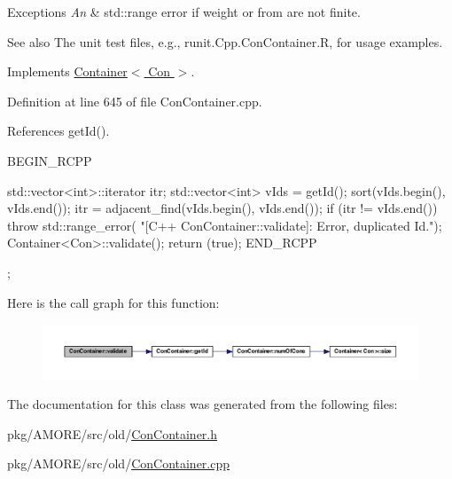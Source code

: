 \begin{DoxyExceptions}{Exceptions}
{\em An} & std::range error if weight or from are not finite.\\
\hline
\end{DoxyExceptions}
\begin{DoxySeeAlso}{See also}
The unit test files, e.g., runit.Cpp.ConContainer.R, for usage examples. 
\end{DoxySeeAlso}


Implements \hyperlink{class_container_acfdc5456a2fc854d1830a8a351567928}{Container$<$ Con $>$}.



Definition at line 645 of file ConContainer.cpp.



References getId().


\begin{DoxyCode}
{
  BEGIN_RCPP

  std::vector<int>::iterator itr;
  std::vector<int> vIds = getId();
  sort(vIds.begin(), vIds.end());
  itr = adjacent_find(vIds.begin(), vIds.end());
  if (itr != vIds.end())
    throw std::range_error(
        "[C++ ConContainer::validate]: Error, duplicated Id.");
  Container<Con>::validate();
  return (true);
END_RCPP};
\end{DoxyCode}


Here is the call graph for this function:
\nopagebreak
\begin{figure}[H]
\begin{center}
\leavevmode
\includegraphics[width=400pt]{class_con_container_aac12a3d3604db9ff715503816109470c_cgraph}
\end{center}
\end{figure}




The documentation for this class was generated from the following files:\begin{DoxyCompactItemize}
\item 
pkg/AMORE/src/old/\hyperlink{_con_container_8h}{ConContainer.h}\item 
pkg/AMORE/src/old/\hyperlink{_con_container_8cpp}{ConContainer.cpp}\end{DoxyCompactItemize}
